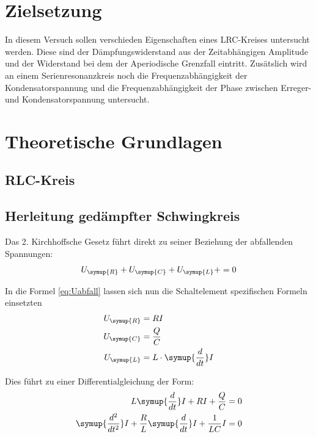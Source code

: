\section{Zielsetzung}
    \noindent In diesem Versuch sollen verschieden Eigenschaften eines LRC-Kreises untersucht werden. Diese sind der Dämpfungswiderstand aus der 
    Zeitabhängigen Amplitude und der Widerstand bei dem der Aperiodische Grenzfall eintritt. Zusätslich wird an einem
    Serienresonanzkreis noch die Frequenzabhängigkeit der Kondensatorspannung und die Frequenzabhängigkeit der Phase zwischen Erreger- und 
    Kondensatorspannung untersucht.
   

\section{Theoretische Grundlagen}


    \subsection{RLC-Kreis}





    \subsection{Herleitung gedämpfter Schwingkreis}


    \noindent Das 2. Kirchhoffsche Gesetz führt direkt zu seiner Beziehung der abfallenden Spannungen:
    \begin{equation}
    U_{\symup{R}} + U_{\symup{C}} + U_{\symup{L}} +  = 0     
    \label{eq:Uabfall}
    \end{equation}

    \noindent In die Formel \ref{eq:Uabfall} lassen sich nun die Schaltelement spezifischen Formeln  einsetzten
    \begin{align}
        U_{\symup{R}} & = RI \nonumber\\
        U_{\symup{C}} & = \frac{Q}{C}\nonumber\\
        U_{\symup{L}} & = L \cdot \symup{\frac{d}{dt}}I \nonumber
    \end{align}

    \noindent Dies führt zu einer Differentialgleichung der Form:
    \begin{align}
        L  \symup{\frac{d}{dt}}I + RI + \frac{Q}{C} & = 0 \nonumber\\
        \symup{\frac{d^2}{dt^2}}I + \frac{R}{L} \symup{\frac{d}{dt}}I + \frac{1}{LC}I & = 0 
        \label{eq:DGL1}
    \end{align}
    

